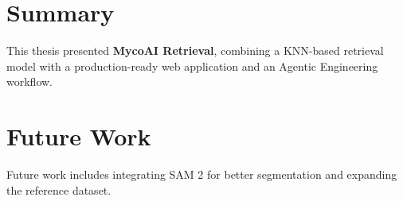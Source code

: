 \section{Summary}
This thesis presented \textbf{MycoAI Retrieval}, combining a KNN-based retrieval model with a production-ready web application and an Agentic Engineering workflow.

\section{Future Work}
Future work includes integrating SAM 2 for better segmentation and expanding the reference dataset.
